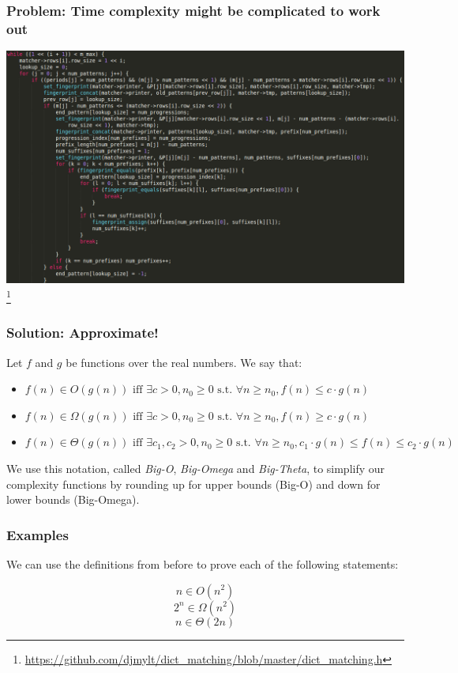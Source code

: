 \documentclass[aspectratio=169]{beamer}
\begin{document}
\begin{frame}
\frametitle{Problem: Time complexity might be complicated to work out}
\includegraphics[scale=0.25]{complex_code}\footnote{\url{https://github.com/djmylt/dict_matching/blob/master/dict_matching.h}}
\end{frame}

\begin{frame}
\frametitle{Solution: Approximate!}
Let $f$ and $g$ be functions over the real numbers. We say that:

\begin{itemize}
\item<1->$f(n) \in O(g(n)) \text{ iff } \exists c > 0, n_0 \geq 0 \text{ s.t. } \forall n \geq n_0, f(n) \leq c \cdot g(n)$

\item<2->$f(n) \in \Omega(g(n)) \text{ iff } \exists c > 0, n_0 \geq 0 \text{ s.t. } \forall n \geq n_0, f(n) \geq c \cdot g(n)$

\item<3->$f(n) \in \Theta(g(n)) \text{ iff } \exists c_1, c_2 > 0, n_0 \geq 0 \text{ s.t. } \forall n \geq n_0, c_1 \cdot g(n) \leq f(n) \leq c_2 \cdot g(n)$
\end{itemize}

We use this notation, called {\em Big-O}, {\em Big-Omega} and {\em Big-Theta}, to simplify our complexity functions by rounding up for upper bounds (Big-O) and down for lower bounds (Big-Omega).
\end{frame}

\begin{frame}
\frametitle{Examples}
We can use the definitions from before to prove each of the following statements:

$$n \in O(n^2)$$
$$2^n \in \Omega(n^2)$$
$$n \in \Theta(2n)$$
\end{frame}
\end{document}
